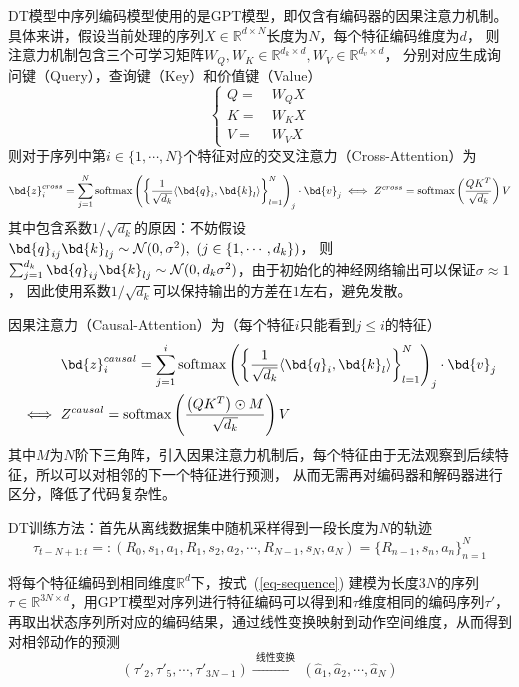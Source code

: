 DT模型中序列编码模型使用的是GPT模型，即仅含有编码器的因果注意力机制。
具体来讲，假设当前处理的序列$X\in\mathbb{R}^{d\times N}$长度为$N$，每个特征编码维度为$d$，
则注意力机制包含三个可学习矩阵$W_{Q},W_{K}\in\mathbb{R}^{d_k\times d}, W_{V}\in\mathbb{R}^{d_v\times d}$，
分别对应生成询问键（Query），查询键（Key）和价值键（Value）
\begin{equation}
  \left\{
  \begin{aligned}
  Q=&\ W_{Q}X\\ K=&\ W_{K}X\\ V=&\ W_{V}X
  \end{aligned}
  \right.
\end{equation}
则对于序列中第$i\in\{1,\cdots,N\}$个特征对应的交叉注意力（Cross-Attention）为
\begin{equation}
  \bd{z}^{cross}_i = \sum_{j=1}^N\text{softmax}\left(\left\{\frac{1}{\sqrt{d_k}}\langle \bd{q}_i,\bd{k}_l\rangle\right\}_{l=1}^N\right)_j\cdot \bd{v}_j\iff
  Z^{cross} = \text{softmax}\left(\frac{QK^T}{\sqrt{d_k}}\right)V
\end{equation}
其中包含系数$1/\sqrt{d_k}$的原因：不妨假设$\bd{q}_{ij}\bd{k}_{lj}\sim \mathcal{N}(0,\sigma^2),~(j\in\{1,\cdots,d_k\})$，
则$\sum_{j=1}^{d_k}\bd{q}_{ij}\bd{k}_{lj}\sim\mathcal{N}(0,d_k\sigma^2)$，由于初始化的神经网络输出可以保证$\sigma\approx 1$，
因此使用系数$1/\sqrt{d_k}$可以保持输出的方差在$1$左右，避免发散。

因果注意力（Causal-Attention）为（每个特征$i$只能看到$j\leqslant i$的特征）
\begin{align}
  &\ \bd{z}^{causal}_i = \sum_{j=1}^i\text{softmax}\left(\left\{\frac{1}{\sqrt{d_k}}\langle \bd{q}_i,\bd{k}_l\rangle \right\}_{l=1}^N\right)_j\cdot \bd{v}_j\\
  \iff &\ Z^{causal} = \text{softmax}\left(\frac{\left(QK^T\right)\odot M}{\sqrt{d_k}}\right)V
  \label{eq-causal-attn}
\end{align}
其中$M$为$N$阶下三角阵，引入因果注意力机制后，每个特征由于无法观察到后续特征，所以可以对相邻的下一个特征进行预测，
从而无需再对编码器和解码器进行区分，降低了代码复杂性。

DT训练方法：首先从离线数据集中随机采样得到一段长度为$N$的轨迹
\begin{equation}
  \tau_{t-N+1:t} =: (R_0,s_1,a_1,R_1,s_2,a_2,\cdots,R_{N-1},s_N,a_N) = \{R_{n-1},s_n,a_n\}_{n=1}^N
\end{equation}

将每个特征编码到相同维度$\mathbb{R}^d$下，按式~(\ref{eq-sequence})
建模为长度$3N$的序列$\tau\in\mathbb{R}^{3N\times d}$，用GPT模型对序列进行特征编码可以得到和$\tau$维度相同的编码序列$\tau'$，
再取出状态序列所对应的编码结果，通过线性变换映射到动作空间维度，从而得到对相邻动作的预测
\begin{equation}
  (\tau'_2,\tau'_5,\cdots, \tau'_{3N-1})\xrightarrow{\text{~线性变换~}}
  (\hat{a}_1,\hat{a}_2,\cdots,  \hat{a}_{N})
\end{equation}

